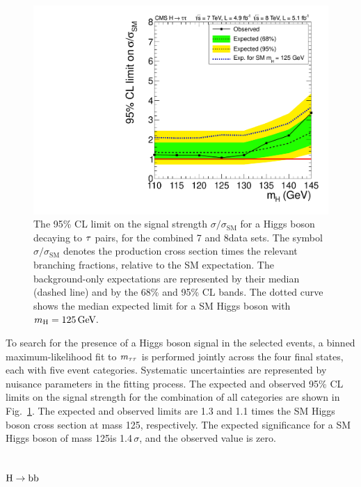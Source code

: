\documentclass[11pt,twoside,a4paper,cmspaper,final]{cms-tdr}
\begin{document}
\begin{figure}[htbp]
  \begin{center}
    \includegraphics[width=\cmsFigWideWidth]{sqr_acls_htt_nominal_inject2_ylin}
    \caption{The 95\% CL limit on the signal strength $\sigma/\sigma_\mathrm{SM}$ for a Higgs boson
      decaying to $\tau$ pairs, for the combined 7 and 8\TeV data sets.
The symbol $\sigma/\sigma_\mathrm{SM}$ denotes the
production cross section times the relevant branching fractions,
relative to the SM expectation.
The background-only expectations are represented by their median (dashed line) and by the 68\%  and 95\% CL bands. The dotted curve shows the median expected limit for a SM Higgs boson with $m_{\mathrm{H}} = 125\,\text{Ge\hspace{-.08em}V}.$
}
    \label{fig:HttLimit}
  \end{center}
\end{figure}

To search for the presence of a Higgs boson signal in the selected events,
a binned maximum-likelihood fit to $m_{\tau\tau}$ is performed jointly
across the four final states, each with five event categories.  Systematic
uncertainties are represented by nuisance parameters in the fitting process.
The expected
and observed 95\% CL limits on the signal strength for the combination of all categories are shown in Fig.~\ref{fig:HttLimit}.
The expected and observed limits are 1.3 and 1.1 times the
SM Higgs boson cross section at mass 125\GeV, respectively.
The expected significance for a SM Higgs boson of mass
125\GeV is 1.4$\,\sigma$, and the observed value is zero.

\subsection{\texorpdfstring{$\mathrm{H}\to\mathrm{b}\mathrm{b}$}{H to bb}\label{sec:Hbb}}
\end{document}
